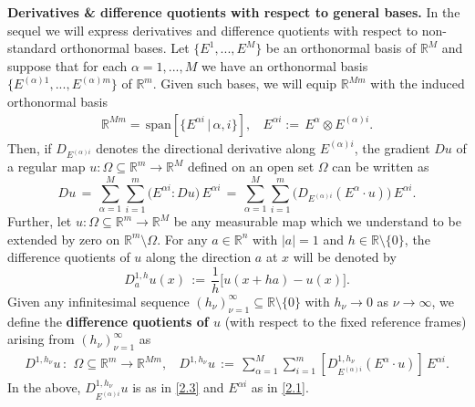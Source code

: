 \documentclass{amsart}
\theoremstyle{definition}
\numberwithin{equation}{section}
\begin{document}
{\noindent} \textbf{Derivatives \& difference quotients with respect to general bases.} In the sequel we will express derivatives and difference quotients with respect to non-standard orthonormal bases. Let $\{E^1,...,E^M\}$ be an orthonormal basis of ${\mathbb{R}}^M$ and suppose that for each ${\alpha}=1,...,M$ we have an orthonormal basis $\{E^{({\alpha})1},...,E^{({\alpha})m}\}$ of ${\mathbb{R}}^m$. Given such bases, we will equip ${\mathbb{R}}^{Mm}$ with the induced orthonormal basis
\begin{equation} \label{2.1}
\begin{split}
 {\mathbb{R}}^{Mm} =\, {\textrm{span}}[ \big\{ E^{{\alpha} i} \,| \, {\alpha},i \big\}],  \ \ \ \  E^{{\alpha} i} := \, E^{\alpha} {\otimes} E^{({\alpha})i}.
\end{split}
\end{equation}
Then, if $D_{E^{({\alpha})i}}$ denotes the directional derivative along $E^{({\alpha})i}$, the gradient $Du$ of a regular map $u:{\Omega} {\subseteq} {\mathbb{R}}^m {\longrightarrow} {\mathbb{R}}^M$ defined on an open set ${\Omega}$ can be written as
\begin{equation} \label{2.2}
Du\, =\, \sum_{{\alpha}=1}^M\sum_{i=1}^m\Big( E^{{\alpha} i} : Du \Big) \, E^{{\alpha} i}\, =\, \sum_{{\alpha}=1}^M\sum_{i=1}^m \Big( D_{E^{({\alpha})i}}(E^{\alpha} \cdot u)\Big) \, E^{{\alpha} i}.
\end{equation}
Further, let $u:{\Omega}{\subseteq} {\mathbb{R}}^m {\longrightarrow} {\mathbb{R}}^M$ be any measurable map which we understand to be extended by zero on ${\mathbb{R}}^m{\setminus}{\Omega}$. For any $a\in {\mathbb{R}}^n$ with $|a|=1$ and $h\in {\mathbb{R}}{\setminus} \{0\}$, the difference quotients of $u$ along the direction $a$ at $x$ will be denoted by
\begin{equation}  \label{2.3}
D^{1,h}_a u(x)\, :=\, \frac{1}{h}\big[u(x+ha)-u(x)\big].
\end{equation} 
Given any infinitesimal sequence $(h_\nu)_{\nu=1}^\infty {\subseteq} {\mathbb{R}}{\setminus}\{0\}$ with $h_\nu{\rightarrow} 0$ as $\nu{\rightarrow} \infty$, we define the \textbf{difference quotients of $u$} (with respect to the fixed reference frames) arising from $(h_\nu)_{\nu=1}^\infty$ as
\begin{equation} \label{2.4}
\begin{split}
 D^{1,h_\nu}u \, :\, \ {\Omega} {\subseteq} {\mathbb{R}}^m {\longrightarrow} {\mathbb{R}}^{Mm},  \ \ \ \  D^{1,h_\nu}u  \, :=  \, \sum_{{\alpha}=1}^M\sum_{i=1}^m  \left[ D^{1,h_\nu}_{E^{({\alpha})i} }(E^{\alpha} \cdot u) \right] \, E^{{\alpha} i} .
\end{split}
\end{equation}
In the above, $D^{1,h_\nu}_{E^{({\alpha})i} }u$ is as in \eqref{2.3} and $E^{{\alpha} i}$ as in \eqref{2.1}.
\end{document}
